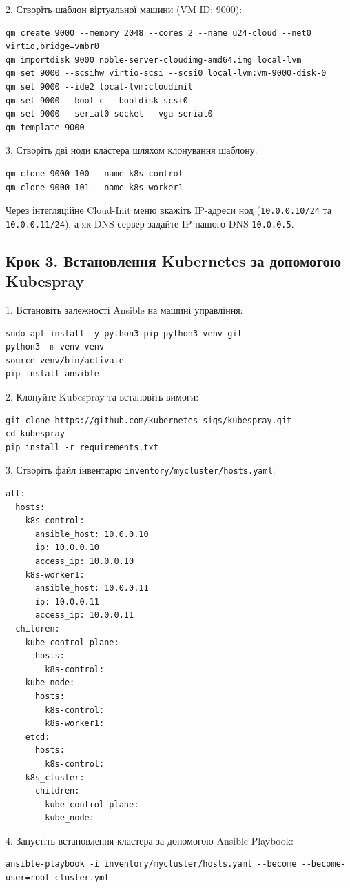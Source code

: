 2. Створіть шаблон віртуальної машини (VM ID: 9000):
\begin{lstlisting}
qm create 9000 --memory 2048 --cores 2 --name u24-cloud --net0 virtio,bridge=vmbr0
qm importdisk 9000 noble-server-cloudimg-amd64.img local-lvm
qm set 9000 --scsihw virtio-scsi --scsi0 local-lvm:vm-9000-disk-0
qm set 9000 --ide2 local-lvm:cloudinit
qm set 9000 --boot c --bootdisk scsi0
qm set 9000 --serial0 socket --vga serial0
qm template 9000
\end{lstlisting}

3. Створіть дві ноди кластера шляхом клонування шаблону:
\begin{lstlisting}
qm clone 9000 100 --name k8s-control
qm clone 9000 101 --name k8s-worker1
\end{lstlisting}
Через інтегляційне Cloud-Init меню вкажіть IP-адреси нод (\texttt{10.0.0.10/24} та \texttt{10.0.0.11/24}), а як DNS-сервер задайте IP нашого DNS \texttt{10.0.0.5}.

\subsection{Крок 3. Встановлення Kubernetes за допомогою Kubespray}
1. Встановіть залежності Ansible на машині управління:
\begin{lstlisting}
sudo apt install -y python3-pip python3-venv git
python3 -m venv venv
source venv/bin/activate
pip install ansible
\end{lstlisting}

2. Клонуйте Kubespray та встановіть вимоги:
\begin{lstlisting}
git clone https://github.com/kubernetes-sigs/kubespray.git
cd kubespray
pip install -r requirements.txt
\end{lstlisting}

3. Створіть файл інвентарю \texttt{inventory/mycluster/hosts.yaml}:
\begin{lstlisting}
all:
  hosts:
    k8s-control:
      ansible_host: 10.0.0.10
      ip: 10.0.0.10
      access_ip: 10.0.0.10
    k8s-worker1:
      ansible_host: 10.0.0.11
      ip: 10.0.0.11
      access_ip: 10.0.0.11
  children:
    kube_control_plane:
      hosts:
        k8s-control:
    kube_node:
      hosts:
        k8s-control:
        k8s-worker1:
    etcd:
      hosts:
        k8s-control:
    k8s_cluster:
      children:
        kube_control_plane:
        kube_node:
\end{lstlisting}

4. Запустіть встановлення кластера за допомогою Ansible Playbook:
\begin{lstlisting}
ansible-playbook -i inventory/mycluster/hosts.yaml --become --become-user=root cluster.yml
\end{lstlisting}

